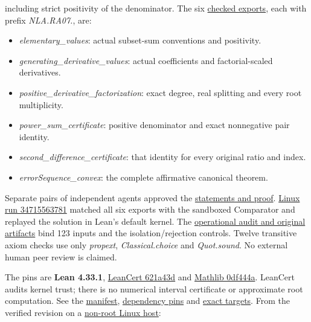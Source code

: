 \documentclass[11pt,a4paper]{article}
\providecommand{\tightlist}{\setlength{\itemsep}{0pt}\setlength{\parskip}{0pt}}
\begin{document}
including strict positivity of the denominator. The six
\href{https://github.com/sgstepaniants/OpenProblemsInNLA/blob/bf144a8ea84992d64f79f4425b18352843376286/randomized-and-low-rank-approximation/RA-07/lean/Solution.lean}{checked
exports}, each with prefix \textit{NLA.RA07.}, are:

\begin{itemize}
\tightlist
\item
  \textit{elementary\_values}: actual subset-sum conventions and
  positivity.
\item
  \textit{generating\_derivative\_values}: actual coefficients and
  factorial-scaled derivatives.
\item
  \textit{positive\_derivative\_factorization}: exact degree, real
  splitting and every root multiplicity.
\item
  \textit{power\_sum\_certificate}: positive denominator and exact
  nonnegative pair identity.
\item
  \textit{second\_difference\_certificate}: that identity for every
  original ratio and index.
\item
  \textit{errorSequence\_convex}: the complete affirmative canonical
  theorem.
\end{itemize}

Separate pairs of independent agents approved the
\href{https://github.com/ajt60gaibb/OpenProblemsInNLA/blob/main/randomized-and-low-rank-approximation/RA-07/lean/reviews}{statements
and proof}.
\href{https://github.com/sgstepaniants/OpenProblemsInNLA/actions/runs/34715563781}{Linux
run 34715563781} matched all six exports with the sandboxed Comparator
and replayed the solution in Lean's default kernel. The
\href{https://github.com/ajt60gaibb/OpenProblemsInNLA/blob/main/randomized-and-low-rank-approximation/RA-07/lean/verification/linux-2026-09-12}{operational
audit and original artifacts} bind 123 inputs and the
isolation/rejection controls. Twelve transitive axiom checks use only
\textit{propext}, \textit{Classical.choice} and \textit{Quot.sound}. No
external human peer review is claimed.

The pins are \textbf{Lean 4.33.1},
\href{https://github.com/alerad/leancert/tree/621a43d7cf21f87872392a01e874f2f1dbddc926}{LeanCert
621a43d} and
\href{https://github.com/leanprover-community/mathlib4/tree/0df444a360eaa60ab8c11dca51a86af692955474}{Mathlib
0df444a}. LeanCert audits kernel trust; there is no numerical interval
certificate or approximate root computation. See the
\href{https://github.com/ajt60gaibb/OpenProblemsInNLA/blob/main/randomized-and-low-rank-approximation/RA-07/lean/formalization.yaml}{manifest},
\href{https://github.com/ajt60gaibb/OpenProblemsInNLA/blob/main/randomized-and-low-rank-approximation/RA-07/lean/lake-manifest.json}{dependency
pins} and
\href{https://github.com/ajt60gaibb/OpenProblemsInNLA/blob/main/randomized-and-low-rank-approximation/RA-07/lean/NUMERICAL_TARGETS.md}{exact
targets}. From the verified revision on a
\href{https://github.com/ajt60gaibb/OpenProblemsInNLA/blob/main/tools/lean/HARNESS.md}{non-root
Linux host}:
\end{document}
